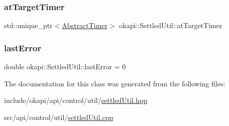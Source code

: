 \subsubsection{\texorpdfstring{atTargetTimer}{atTargetTimer}}
{\footnotesize\ttfamily std\+::unique\+\_\+ptr$<$\mbox{\hyperlink{classokapi_1_1AbstractTimer}{Abstract\+Timer}}$>$ okapi\+::\+Settled\+Util\+::at\+Target\+Timer\hspace{0.3cm}{\ttfamily [protected]}}

\mbox{\label{classokapi_1_1SettledUtil_ac1316106ec5932cc9f6de5cd83d3e155}} 
\subsubsection{\texorpdfstring{lastError}{lastError}}
{\footnotesize\ttfamily double okapi\+::\+Settled\+Util\+::last\+Error = 0\hspace{0.3cm}{\ttfamily [protected]}}



The documentation for this class was generated from the following files\+:\begin{DoxyCompactItemize}
\item 
include/okapi/api/control/util/\mbox{\hyperlink{settledUtil_8hpp}{settled\+Util.\+hpp}}\item 
src/api/control/util/\mbox{\hyperlink{settledUtil_8cpp}{settled\+Util.\+cpp}}\end{DoxyCompactItemize}
